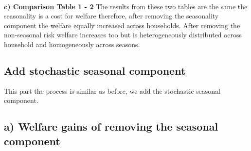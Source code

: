 \documentclass[11pt]{article}
\begin{document}
    \begin{center}
    \end{center}
    { \hspace*{\fill} \\}
    
\textbf{c) Comparison Table 1 - 2}
The results from these two tables are the same the seasonality is a cost for welfare therefore, after removing the seasonality component the welfare equally increased across households. After removing the non-seasonal risk welfare increases too but is heterogeneously distributed across household and homogeneously across seasons.

\subsection*{Add stochastic seasonal component}
This part the process is similar as before, we add the stochastic seasonal component.
\subsection*{a) Welfare gains of removing the seasonal component}
\end{document}

